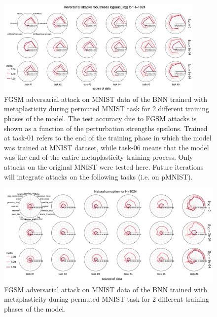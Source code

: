 \documentclass[manuscript,screen,review]{acmart}
\begin{document}
\begin{figure}
    \centering
    \includegraphics[width=0.9\textwidth]{figures/report/Fig5.pdf}
    \caption{FGSM adversarial attack on MNIST data of the BNN trained with metaplasticity during permuted MNIST task for 2 different training phases of the model. The test accuracy due to FGSM attacks is shown as a function of the perturbation strengths epsilons. Trained at task-01 refers to the end of the training phase in which the model was trained at MNIST dataset, while task-06 means that the model was the end of the entire metaplasticity training process. Only attacks on the original MNIST were tested here. Future iterations will integrate attacks on the following tasks (i.e. on pMNIST). }
    \label{fig:fig5}
\end{figure}



\begin{figure}
    \centering
    \includegraphics[width=\textwidth]{figures/report/Fig6.pdf}
    \caption{FGSM adversarial attack on MNIST data of the BNN trained with metaplasticity during permuted MNIST task for 2 different training phases of the model. 
    }
    \label{fig:fig6}
\end{figure}
\end{document}
